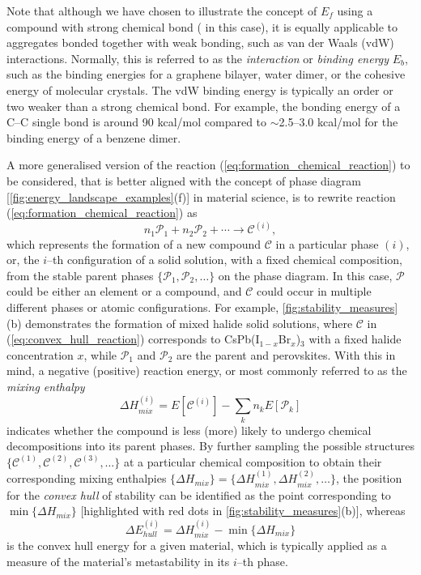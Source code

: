 Note that although we have chosen to illustrate the concept of $E_f$ using a compound with strong chemical bond ( in this case), it is equally applicable to aggregates bonded together with weak bonding, such as van der Waals (vdW) interactions. Normally, this is referred to as the \emph{interaction} or \emph{binding energy} $E_{b}$, such as the binding energies for a graphene bilayer, water dimer, or the cohesive energy of molecular crystals. The vdW binding energy is typically an order or two weaker than a strong chemical bond.  For example, the bonding energy of a C--C single bond is around 90 kcal/mol compared to $\sim$2.5--3.0 kcal/mol for the binding energy of a benzene dimer.

A more generalised version of the reaction (\cref{eq:formation_chemical_reaction}) to be considered, that is better aligned with the concept of phase diagram [\cref{fig:energy_landscape_examples}(f)] in material science, is to rewrite reaction (\cref{eq:formation_chemical_reaction}) as 
\begin{equation}\label{eq:convex_hull_reaction}
n_{1}\mathcal{P}_{1}+n_{2}\mathcal{P}_2+\cdots\to \mathcal{C}^{(i)},
\end{equation}
which represents the formation of a new compound $\mathcal{C}$ in a particular phase $(i)$, or, the $i$--th configuration of a solid solution, with a fixed chemical composition, from the stable parent phases  $\{\mathcal{P}_{1},\mathcal{P}_{2},\ldots\}$ on the phase diagram. In this case, $\mathcal{P}$ could be either an element or a compound, and $\mathcal{C}$ could occur in multiple different phases or atomic configurations. For example, \cref{fig:stability_measures} (b) demonstrates the formation of  mixed halide solid solutions, where  $\mathcal{C}$ in (\cref{eq:convex_hull_reaction}) corresponds to CsPb(I$_{1-x}$Br$_{x}$)$_3$ with a fixed halide concentration $x$, while $\mathcal{P}_{1}$ and $\mathcal{P}_{2}$ are the parent  and  perovskites. With this in mind, a negative (positive) reaction energy, or most commonly referred to as the \emph{mixing enthalpy} 
\begin{equation}\label{eq:mixing_enthalpy}
\Delta H_{mix}^{(i)}=E[\mathcal{C}^{(i)}]-\sum_k n_k E[\mathcal{P}_{k}]
\end{equation}
indicates whether the compound is less (more) likely to undergo chemical decompositions into its parent phases.   By further sampling the possible structures $\{\mathcal{C}^{(1)},\mathcal{C}^{(2)},\mathcal{C}^{(3)},\ldots\}$ at a particular chemical composition to obtain their corresponding mixing enthalpies $\{\Delta H_{mix}\}=\{\Delta H_{mix}^{(1)},\Delta H_{mix}^{(2)},\ldots\}$, the position for the \textit{convex hull} of stability can be identified as the point corresponding to $\min\{\Delta H_{mix}\}$ [highlighted with red dots in \cref{fig:stability_measures}(b)], whereas
\begin{equation}\label{eq:convex_hull_energy}
\Delta E_{hull}^{(i)}=\Delta H_{mix}^{(i)} - \min\{\Delta H_{mix}\}
\end{equation}
is the convex hull energy for a given material, which is typically applied as a measure of the material's metastability in its $i$--th phase.\cite{sun2016thermodynamic}

